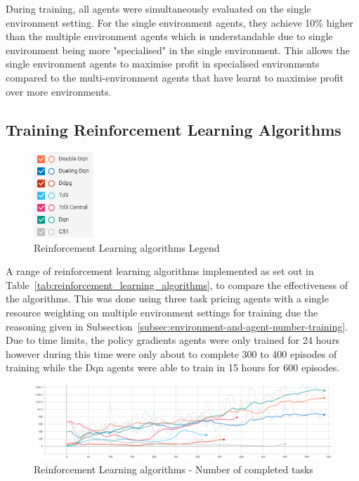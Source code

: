 During training, all agents were simultaneously evaluated on the single environment setting. For the single environment
agents, they achieve 10\% higher than the multiple environment agents which is understandable due to single environment
being more "specialised" in the single environment. This allows the single environment agents to maximise profit in
specialised environments compared to the multi-environment agents that have learnt to maximise profit over more
environments.

\subsection{Training Reinforcement Learning Algorithms}
\label{subsec:training-reinforcement-learning-algorithms}

\begin{figure}
    \includegraphics[width=0.2\textwidth]{figures/5_evaluation_figs/algo_training_fig/legend.png}
    \caption{Reinforcement Learning algorithms Legend}
    \label{fig:algo-training-legend}
\end{figure}

A range of reinforcement learning algorithms implemented as set out in Table~\ref{tab:reinforcement_learning_algorithms},
to compare the effectiveness of the algorithms. This was done using three task pricing agents with
a single resource weighting on multiple environment settings for training due the reasoning given in
Subsection~\ref{subsec:environment-and-agent-number-training}. Due to time limits, the policy gradients agents were
only trained for 24 hours however during this time were only about to complete 300 to 400 episodes of training while
the Dqn agents were able to train in 15 hours for 600 episodes.

\begin{figure}[H]
    \centering
    \includegraphics[width=\linewidth]{figures/5_evaluation_figs/algo_training_fig/num_completed_tasks.PNG}
    \caption{Reinforcement Learning algorithms - Number of completed tasks}
    \label{fig:algo-num-completed_tasks}
\end{figure}

